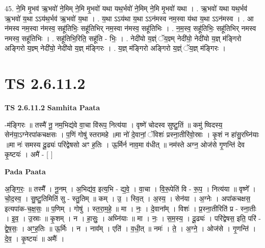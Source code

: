 \documentclass[17pt]{extarticle}
\begin{document}
45. ने॒मि मृ॒भव॑ ऋ॒भवो॑ ने॒मिम् ने॒मि मृ॒भवो॑ यथा यथ॒र्भवो॑ ने॒मिम् ने॒मि मृ॒भवो॑ यथा । . ऋ॒भवो॑ यथा यथ॒र्भव॑ ऋ॒भवो॑ य॒था ऽऽय॑थ॒र्भव॑ ऋ॒भवो॑ य॒था । . य॒था ऽऽय॑था य॒था ऽऽन॑मस्व नम॒स्वा य॑था य॒था ऽऽन॑मस्व । . आ न॑मस्व नम॒स्वा न॑मस्व॒ सहू॑तिभिः॒ सहू॑तिभिर् नम॒स्वा न॑मस्व॒ सहू॑तिभिः । . न॒म॒स्व॒ सहू॑तिभिः॒ सहू॑तिभिर् नमस्व नमस्व॒ सहू॑तिभिः । . सहू॑तिभि॒रिति॒ सहू॑ति - भिः॒ । . नेदी॑यो य॒ज्ञ्ं ॅय॒ज्ञ्म् नेदी॑यो॒ नेदी॑यो य॒ज्ञ् म॑ङ्गिरो अङ्गिरो य॒ज्ञ्म् नेदी॑यो॒ नेदी॑यो य॒ज्ञ् म॑ङ्गिरः । . य॒ज्ञ् म॑ङ्गिरो अङ्गिरो य॒ज्ञ्ं ॅय॒ज्ञ् म॑ङ्गिरः । \newline
\pagebreak
{}
\section*{ TS 2.6.11.2 }

\textbf{TS 2.6.11.2 } \newline
\textbf{Samhita Paata} \newline

-म॑ङ्गिरः ॥ तस्मै॑ नू॒ नम॒भिद्य॑वे वा॒चा वि॑रूप॒ नित्य॑या । वृष्णे॑ चोदस्व सुष्टु॒तिं ॥ कमु॑ ष्विदस्य॒ सेन॑या॒ऽग्नेरपा॑कचक्षसः । प॒णिं गोषु॑ स्तरामहे ॥मा नो॑ दे॒वानां॒ ॅविशः॑ प्रस्ना॒तीरि॑वो॒स्राः । कृ॒शं न हा॑सु॒रघ्नि॑याः ॥मा नः॑ समस्य दू॒ढ्यः॑ परि॑द्वेषसो अꣳ ह॒तिः । ऊ॒र्मिर्न नाव॒मा व॑धीत् ॥ नम॑स्ते अग्न॒ ओज॑से गृ॒णन्ति॑ देव कृ॒ष्टयः॑ । अमै॑ - [  ] \newline

\textbf{Pada Paata} \newline

अ॒ङ्गि॒रः॒ ॥ तस्मै᳚ । नू॒नम् । अ॒भिद्य॑व॒ इत्य॒भि - द्य॒वे॒ । वा॒चा । वि॒रू॒पेति॑ वि - रू॒प॒ । नित्य॑या ॥ वृष्णे᳚ । चो॒द॒स्व॒ । सु॒ष्टु॒तिमिति॑ सु - स्तु॒तिम् ॥ कम् । उ॒ । स्वि॒त् । अ॒स्य॒ । सेन॑या । अ॒ग्नेः । अपा॑कचक्षस॒ इत्यपा॑क-च॒क्ष॒सः॒ ॥ प॒णिम् । गोषु॑ । स्त॒रा॒म॒हे॒ ॥ मा । नः॒ । दे॒वाना᳚म् । विशः॑ । प्र॒स्ना॒तीरिति॑ प्र - स्ना॒तीः । इ॒व॒ । उ॒स्राः ॥ कृ॒शम् । न । हा॒सुः॒ । अघ्नि॑याः ॥ मा । नः॒ । स॒म॒स्य॒ । दू॒ढ्यः॑ । परि॑द्वेषस॒ इति॒ परि॑ - द्वे॒ष॒सः॒ । अꣳ॒॒ह॒तिः ॥ ऊ॒र्मिः । न । नाव᳚म् । एति॑ । व॒धी॒त् ॥ नमः॑ । ते॒ । अ॒ग्ने॒ । ओज॑से । गृ॒णन्ति॑ । दे॒व॒ । कृ॒ष्टयः॑ ॥ अमैः᳚ ।  \newline
\end{document}
